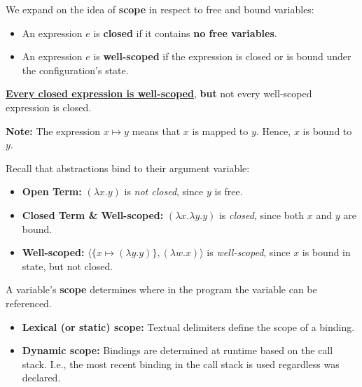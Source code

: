     
\begin{Def}

    \label{def:well-scopedness}

    We expand on the idea of \textbf{scope} in respect to free and bound variables: 

    \begin{itemize}
        
        \item 
        An expression \( e \) is \textbf{closed} if it contains \textbf{no free variables}.
        \item 
        An expression \( e \) is \textbf{well-scoped} if the expression is closed or is bound under the configuration's state.
    \end{itemize}
    \noindent
    \underline{\textbf{Every closed expression is well-scoped}}, \textbf{but} not every well-scoped expression is closed.
\end{Def}

\begin{Note}
\textbf{Note:} The expression $x\mapsto y$ means that $x$ is mapped to $y$. Hence, $x$ is bound to $y$.
\end{Note}
\begin{Example}
    
    \label{ex:closed-terms}
    Recall that abstractions bind to their argument variable:
    \begin{itemize}
        \item \textbf{Open Term:} \((\lambda x. y)\) is \emph{not closed}, since \(y\) is free.
        \item \textbf{Closed Term \& Well-scoped:} \((\lambda x. \lambda y. y)\) is \emph{closed}, since both \(x\) and \(y\) are bound.
        \item \textbf{Well-scoped:} $\langle \{x\mapsto (\lambda y. y)\}, (\lambda w.x)\rangle$ is \emph{well-scoped}, since \(x\) is bound in state, but not closed.
    \end{itemize}

\end{Example}

\begin{Def}

    \label{def:scope}

    \noindent
    A variable's \textbf{scope} determines where in the program the variable can be referenced.

    \begin{itemize}
        \item \textbf{Lexical (or static) scope:} Textual delimiters define the scope of a binding.
        
        \item \textbf{Dynamic scope:} Bindings are determined at runtime based on the call stack. I.e., the most recent binding in the call stack is used regardless 
        was declared.
    \end{itemize}
\end{Def}

